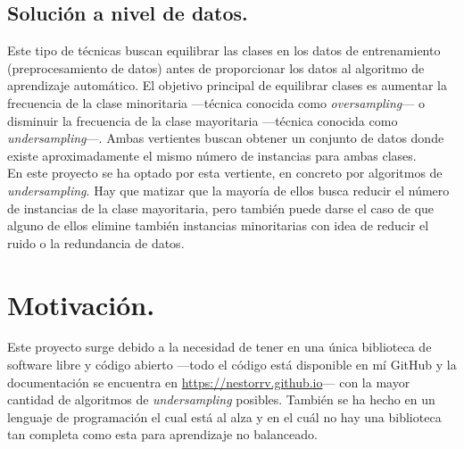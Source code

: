 \subsection{Solución a nivel de datos.} \label{subsec:datalevel}

Este tipo de técnicas buscan equilibrar las clases en los datos de entrenamiento (preprocesamiento de datos) antes de proporcionar los datos al algoritmo de aprendizaje automático. El objetivo principal de equilibrar clases es aumentar la frecuencia de la clase minoritaria —técnica conocida como \textit{oversampling}— o disminuir la frecuencia de la clase mayoritaria —técnica conocida como \textit{undersampling}—. Ambas vertientes buscan obtener un conjunto de datos donde existe aproximadamente el mismo número de instancias para ambas clases. \\

En este proyecto se ha optado por esta vertiente, en concreto por algoritmos de \textit{undersampling}. Hay que matizar que la mayoría de ellos busca reducir el número de instancias de la clase mayoritaria, pero también puede darse el caso de que alguno de ellos elimine también instancias minoritarias con idea de reducir el ruido o la redundancia de datos.

\section{Motivación.} \label{sec:motivacion}

Este proyecto surge debido a la necesidad de tener en una única biblioteca de software libre y código abierto —todo el código está disponible en mí GitHub \cite{undersampling-github} y la documentación se encuentra en \href{https://nestorrv.github.io}{https://nestorrv.github.io}— con la mayor cantidad de algoritmos de \textit{undersampling} posibles. También se ha hecho en un lenguaje de programación el cual está al alza y en el cuál no hay una biblioteca tan completa como esta para aprendizaje no balanceado. 
